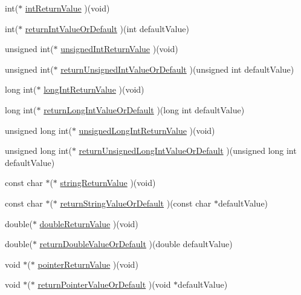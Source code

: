 \begin{DoxyCompactItemize}
\item 
int($\ast$ \hyperlink{struct_s_mock_actual_call__c_aad818a82edd6c5f9caab3e4b0f57a772}{int\+Return\+Value} )(void)
\item 
int($\ast$ \hyperlink{struct_s_mock_actual_call__c_a781e904090c1ca3ec3b5cf085a10e2bc}{return\+Int\+Value\+Or\+Default} )(int default\+Value)
\item 
unsigned int($\ast$ \hyperlink{struct_s_mock_actual_call__c_a9f27bbb3d4783f56a4b65c909d0117c8}{unsigned\+Int\+Return\+Value} )(void)
\item 
unsigned int($\ast$ \hyperlink{struct_s_mock_actual_call__c_a5bcd1d17f1468d2d48778c42c05a222a}{return\+Unsigned\+Int\+Value\+Or\+Default} )(unsigned int default\+Value)
\item 
long int($\ast$ \hyperlink{struct_s_mock_actual_call__c_a1d43b8bf086a5ba30d408e2125d11839}{long\+Int\+Return\+Value} )(void)
\item 
long int($\ast$ \hyperlink{struct_s_mock_actual_call__c_a70a97eb5b9ca3623f7ae131d427932f3}{return\+Long\+Int\+Value\+Or\+Default} )(long int default\+Value)
\item 
unsigned long int($\ast$ \hyperlink{struct_s_mock_actual_call__c_a5dab94d3a7f6424d399581cf4f0f6152}{unsigned\+Long\+Int\+Return\+Value} )(void)
\item 
unsigned long int($\ast$ \hyperlink{struct_s_mock_actual_call__c_aeb93f4fd4eedf7c83d4bdf04eab48e3c}{return\+Unsigned\+Long\+Int\+Value\+Or\+Default} )(unsigned long int default\+Value)
\item 
const char $\ast$($\ast$ \hyperlink{struct_s_mock_actual_call__c_aefdb35b7b60e7b4cbbc8205661f8ecae}{string\+Return\+Value} )(void)
\item 
const char $\ast$($\ast$ \hyperlink{struct_s_mock_actual_call__c_a57df1d8b45c09709b1d15c3213ca86ba}{return\+String\+Value\+Or\+Default} )(const char $\ast$default\+Value)
\item 
double($\ast$ \hyperlink{struct_s_mock_actual_call__c_a7ecb3db593fac63b35159a89a7dfeed2}{double\+Return\+Value} )(void)
\item 
double($\ast$ \hyperlink{struct_s_mock_actual_call__c_af0c6afe5e9c03b93b3f636894f06f7fd}{return\+Double\+Value\+Or\+Default} )(double default\+Value)
\item 
void $\ast$($\ast$ \hyperlink{struct_s_mock_actual_call__c_abacba40fdd32e5aed923df2a2ad4bd84}{pointer\+Return\+Value} )(void)
\item 
void $\ast$($\ast$ \hyperlink{struct_s_mock_actual_call__c_a5ea57c5c895836ca7b36211167811712}{return\+Pointer\+Value\+Or\+Default} )(void $\ast$default\+Value)

\end{DoxyCompactItemize}
